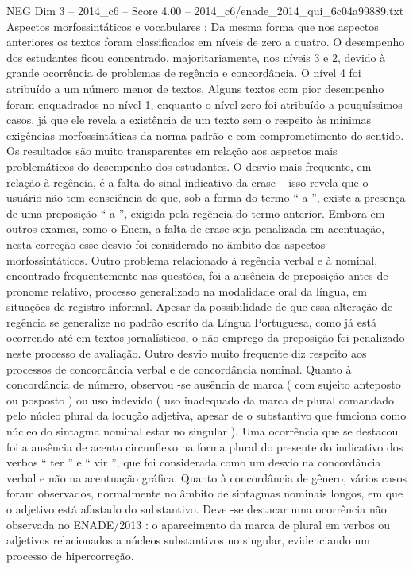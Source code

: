 \begin{textsample}{NEG Dim 3 – 2014\_c6 – Score 4.00 – 2014\_c6/enade\_2014\_qui\_6c04a99889.txt}
Aspectos morfossintáticos e vocabulares : Da mesma forma que nos aspectos anteriores os textos foram classificados em níveis de zero a quatro.
O desempenho dos estudantes ficou concentrado, majoritariamente, nos níveis 3 e 2, devido à grande ocorrência de problemas de regência e concordância.
O nível 4 foi atribuído a um número menor de textos.
Alguns textos com pior desempenho foram enquadrados no nível 1, enquanto o nível zero foi atribuído a pouquíssimos casos, já que ele revela a existência de um texto sem o respeito às mínimas exigências morfossintáticas da norma-padrão e com comprometimento do sentido.
Os resultados são muito transparentes em relação aos aspectos mais problemáticos do desempenho dos estudantes.
O desvio mais frequente, em relação à regência, é a falta do sinal indicativo da crase – isso revela que o usuário não tem consciência de que, sob a forma do termo “ a ”, existe a presença de uma preposição “ a ”, exigida pela regência do termo anterior.
Embora em outros exames, como o Enem, a falta de crase seja penalizada em acentuação, nesta correção esse desvio foi considerado no âmbito dos aspectos morfossintáticos.
Outro problema relacionado à regência verbal e à nominal, encontrado frequentemente nas questões, foi a ausência de preposição antes de pronome relativo, processo generalizado na modalidade oral da língua, em situações de registro informal.
Apesar da possibilidade de que essa alteração de regência se generalize no padrão escrito da Língua Portuguesa, como já está ocorrendo até em textos jornalísticos, o não emprego da preposição foi penalizado neste processo de avaliação.
Outro desvio muito frequente diz respeito aos processos de concordância verbal e de concordância nominal.
Quanto à concordância de número, observou -se ausência de marca ( com sujeito anteposto ou posposto ) ou uso indevido ( uso inadequado da marca de plural comandado pelo núcleo plural da locução adjetiva, apesar de o substantivo que funciona como núcleo do sintagma nominal estar no singular ).
Uma ocorrência que se destacou foi a ausência de acento circunflexo na forma plural do presente do indicativo dos verbos “ ter ” e “ vir ”, que foi considerada como um desvio na concordância verbal e não na acentuação gráfica.
Quanto à concordância de gênero, vários casos foram observados, normalmente no âmbito de sintagmas nominais longos, em que o adjetivo está afastado do substantivo.
Deve -se destacar uma ocorrência não observada no ENADE/2013 : o aparecimento da marca de plural em verbos ou adjetivos relacionados a núcleos substantivos no singular, evidenciando um processo de hipercorreção.

\end{textsample}
